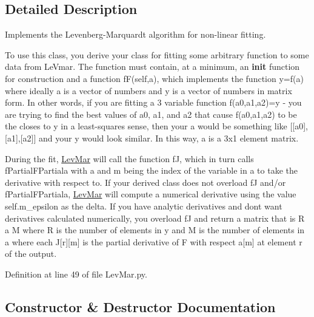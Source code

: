 \subsection{Detailed Description}
Implements the Levenberg-\/\+Marquardt algorithm for non-\/linear fitting. 

To use this class, you derive your class for fitting some arbitrary function to some data from Le\+Vmar. The function must contain, at a minimum, an {\bfseries init} function for construction and a function f\+F(self,a), which implements the function y=f(a) where ideally a is a vector of numbers and y is a vector of numbers in matrix form. In other words, if you are fitting a 3 variable function f(a0,a1,a2)=y -\/ you are trying to find the best values of a0, a1, and a2 that cause f(a0,a1,a2) to be the closes to y in a least-\/squares sense, then your a would be something like \mbox{[}\mbox{[}a0\mbox{]},\mbox{[}a1\mbox{]},\mbox{[}a2\mbox{]}\mbox{]} and your y would look similar. In this way, a is a 3x1 element matrix.

During the fit, \hyperlink{classSignalIntegrity_1_1Fit_1_1LevMar_1_1LevMar}{Lev\+Mar} will call the function fJ, which in turn calls f\+Partial\+F\+Partiala with a and m being the index of the variable in a to take the derivative with respect to. If your derived class does not overload fJ and/or f\+Partial\+F\+Partiala, \hyperlink{classSignalIntegrity_1_1Fit_1_1LevMar_1_1LevMar}{Lev\+Mar} will compute a numerical derivative using the value self.\+m\+\_\+epsilon as the delta. If you have analytic derivatives and don\textquotesingle{}t want derivatives calculated numerically, you overload fJ and return a matrix that is R a M where R is the number of elements in y and M is the number of elements in a where each J\mbox{[}r\mbox{]}\mbox{[}m\mbox{]} is the partial derivative of F with respect a\mbox{[}m\mbox{]} at element r of the output. 

Definition at line 49 of file Lev\+Mar.\+py.



\subsection{Constructor \& Destructor Documentation}
\mbox{\label{classSignalIntegrity_1_1Fit_1_1LevMar_1_1LevMar_a5580a7fcf0bfd317a8f8c7c80eefdd69}} 
